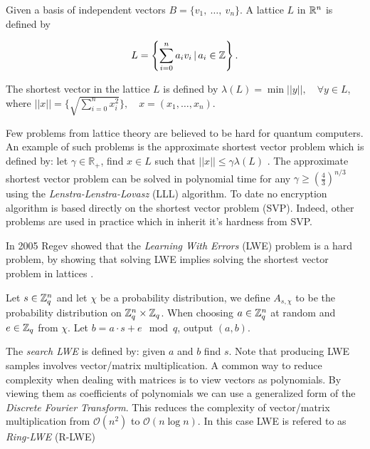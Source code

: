 \begin{definition}
    Given a basis of independent vectors $B = \{v_1,\ \ldots,\ v_n\}$. A
    lattice $L$ in $\mathbb{R}^n$ is defined by

    \[L = \left\{ \sum_{i = 0}^n a_iv_i \, | \, a_i \in \mathbb{Z} \right\}.\]
\end{definition}


The shortest vector in the lattice $L$ is defined by
$\lambda(L) = \min || y ||, \quad \forall y \in L$, where
$||x|| = \{\sqrt{\sum_{i=0}^n x^2_i}\}, \quad x = (x_1, \ldots, x_n)$.

Few problems from lattice theory are believed to be hard for
quantum computers. An example of such problems is the approximate shortest
vector problem which is defined by: let $\gamma \in \mathbb{R}_+$, find $x \in
L$ such that $||x|| \leq \gamma \lambda(L)$ \citep{ajtai1998shortest}. The
approximate shortest vector problem can be solved in polynomial time for any
$\gamma \geq (\frac{4}{3})^{n/3}$ using the \textit{Lenstra-Lenstra-Lovasz}
(LLL) algorithm. To date no encryption algorithm is based directly on the
shortest vector problem (SVP). Indeed, other problems are used in practice
which in inherit it's hardness from SVP.

In 2005 Regev showed that the \textit{Learning With Errors} (LWE) problem is a
hard problem, by showing that solving LWE implies solving the shortest vector
problem in lattices \citep{Regev05}.

\begin{definition}

    Let $s \in \mathbb{Z}^n_q$ and let $\chi$ be a probability distribution, we define
    $A_{s, \chi}$ to be the probability distribution on $\mathbb{Z}^n_q \times \mathbb{Z}_q$.
    When choosing $a \in \mathbb{Z}^n_q$ at random and $e \in \mathbb{Z}_q$ from $\chi$. Let
    $b = a \cdot s + e \mod q$, output $(a,b)$.

\end{definition}

The \textit{search LWE} is defined by: given $a$ and $b$ find $s$.
Note that producing LWE samples involves vector/matrix multiplication. A common
way to reduce complexity when dealing with matrices is to view vectors as
polynomials. By viewing them as coefficients of polynomials we can use a
generalized form of the \textit{Discrete Fourier Transform}. This reduces the
complexity of vector/matrix multiplication from $\mathcal{O}(n^2)$ to
$\mathcal{O}(n \log n)$. In this case LWE is refered to as \textit{Ring-LWE}
(R-LWE)

